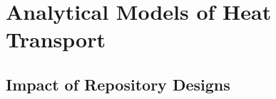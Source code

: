 

% 









\section{Analytical Models of Heat Transport}
\label{sec:analytical_heat}


\subsection{Impact of Repository Designs}

